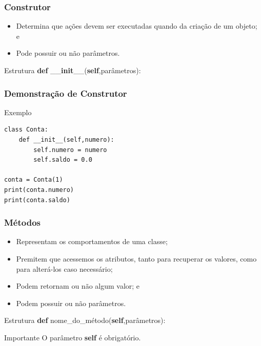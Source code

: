 \documentclass{beamer}
\begin{document}
\begin{frame}
	\frametitle{Construtor}
	
	\begin{itemize}
		\item Determina que ações devem ser executadas quando da criação de um objeto; e
		\item Pode possuir ou não parâmetros.
	\end{itemize} \vfill
	
	\begin{block}{Estrutura}
	\textbf{def} \_\_\textbf{init}\_\_(\textbf{self},parâmetros):
	\end{block}
\end{frame}

\begin{frame}[fragile]
	\frametitle{Demonstração de Construtor}
	
	\begin{exampleblock}{Exemplo}
		\begin{lstlisting}
class Conta:
    def __init__(self,numero):
        self.numero = numero
        self.saldo = 0.0
			    			   			
conta = Conta(1)	
print(conta.numero)
print(conta.saldo)
		\end{lstlisting}
	\end{exampleblock}
\end{frame}


\begin{frame}
	\frametitle{Métodos}
	
	\begin{itemize}
		\item Representam os comportamentos de uma classe;
		\item Premitem que acessemos os atributos, tanto para recuperar os valores, como para alterá-los caso necessário;
		\item Podem retornam ou não algum valor; e
		\item Podem possuir ou não parâmetros.
	\end{itemize} \vfill 
	
	\begin{block}{Estrutura}
		\textbf{def} nome\_do\_método(\textbf{self},parâmetros):
	\end{block} \vfill
	
	\begin{alertblock}{Importante}
		O parâmetro \textbf{self} é obrigatório.
	\end{alertblock}
\end{frame}
\end{document}
